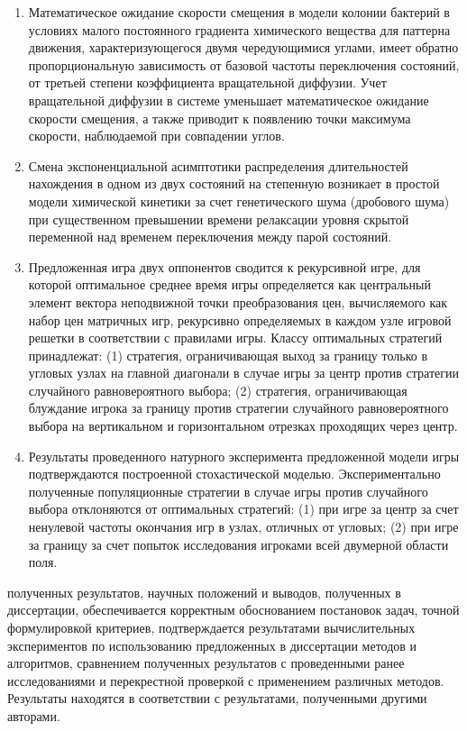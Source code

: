 {}
\begin{enumerate}[beginpenalty=10000] %
    \item Математическое ожидание скорости смещения в модели колонии бактерий в условиях малого постоянного градиента химического вещества для паттерна движения, характеризующегося двумя чередующимися углами, имеет обратно пропорциональную зависимость от базовой частоты переключения состояний, от третьей степени коэффициента вращательной диффузии. Учет вращательной диффузии в системе уменьшает математическое ожидание скорости смещения, а также приводит к появлению точки максимума скорости, наблюдаемой при совпадении углов.
    \item Смена экспоненциальной асимптотики распределения длительностей нахождения в одном из двух состояний на степенную  возникает в простой модели химической кинетики за счет генетического шума (дробового шума) при существенном превышении времени релаксации уровня скрытой переменной над временем переключения между парой состояний. 
    \item Предложенная игра двух оппонентов сводится к рекурсивной игре, для которой оптимальное среднее время игры определяется как центральный элемент вектора неподвижной точки преобразования цен, вычисляемого как набор цен матричных игр, рекурсивно определяемых в каждом узле игровой решетки в соответствии с правилами игры. Классу оптимальных стратегий принадлежат: (1) стратегия, ограничивающая выход за границу только в угловых узлах на главной диагонали в случае игры за центр против стратегии случайного равновероятного выбора; (2) стратегия, ограничивающая блуждание игрока за границу против стратегии случайного равновероятного выбора на вертикальном и горизонтальном отрезках проходящих через центр.
    \item Результаты проведенного натурного эксперимента предложенной модели игры подтверждаются построенной стохастической моделью. Экспериментально полученные популяционные стратегии в случае игры против случайного выбора отклоняются от оптимальных стратегий: (1) при игре за центр за счет ненулевой частоты окончания игр в узлах, отличных от угловых; (2) при игре за границу за счет попыток исследования игроками всей двумерной области поля. 
\end{enumerate}

{\reliability} полученных результатов, научных положений и выводов, полученных в диссертации, обеспечивается корректным обоснованием постановок задач, точной формулировкой критериев, подтверждается результатами вычислительных экспериментов по использованию предложенных в диссертации методов и алгоритмов, сравнением полученных результатов с проведенными ранее исследованиями и перекрестной проверкой с применением различных методов. Результаты находятся в соответствии с результатами, полученными другими авторами.

